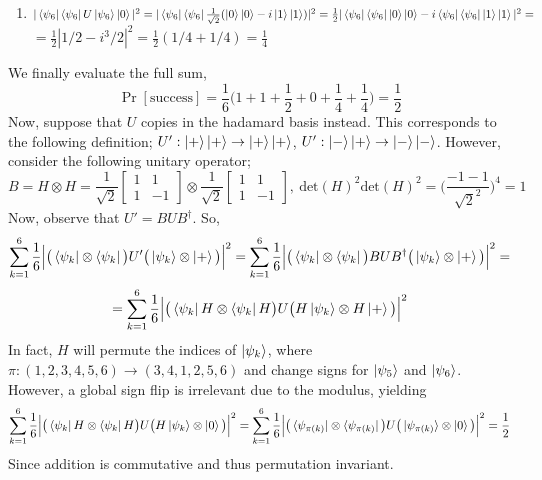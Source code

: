 \documentclass[12pt]{article}
\begin{document}
\begin{enumerate}
\begin{enumerate}
    \item $|\bra{\psi_6}\bra{\psi_6}U\ket{\psi_6} \ket{0}|^2 = |\bra{\psi_6}\bra{\psi_6}\frac{1}{\sqrt{2}}(\ket{0}\ket{0} - i\ket{1}\ket{1})|^2 = \frac{1}{2}|\bra{\psi_6}\bra{\psi_6}\ket{0}\ket{0} - i\bra{\psi_6}\bra{\psi_6}\ket{1}\ket{1}|^2 = $\\
    $= \frac{1}{2}|1/2 - i^3/2|^2 = \frac{1}{2}(1/4+1/4) = \frac{1}{4}$
\end{enumerate}
We finally evaluate the full sum,
$$ \Pr[\text{success}] = \frac{1}{6}\Big(1 + 1 + \frac{1}{2} + 0 + \frac{1}{4} + \frac{1}{4}\Big) = \frac{1}{2} $$
Now, suppose that $U$ copies in the hadamard basis instead. This corresponds to the following definition; $U' : \ket{+}\ket{+} \rightarrow \ket{+}\ket{+}$, $U' : \ket{-}\ket{+} \rightarrow \ket{-}\ket{-}$. However, consider the following unitary operator;
\[ B = H\otimes H = \frac{1}{\sqrt{2}}\begin{bmatrix}
1 & 1 \\
1 & -1
\end{bmatrix}\otimes \frac{1}{\sqrt{2}}\begin{bmatrix}
1 & 1 \\
1 & -1
\end{bmatrix},\ \text{det}(H)^2\text{det}(H)^2 = \Big(\frac{-1 - 1}{\sqrt{2}^2}\Big)^4 = 1
\]
Now, observe that $U' = BUB^\dagger$. So,
$$ \sum_{k=1}^6 \frac{1}{6}\Big| \big( \bra{\psi_k}\otimes \bra{\psi_k} \big) U' \big( \ket{\psi_k}\otimes \ket{+} \big) \Big|^2 = \sum_{k=1}^6 \frac{1}{6}\Big| \big( \bra{\psi_k}\otimes \bra{\psi_k} \big) B U B^\dagger \big( \ket{\psi_k} \otimes \ket{+} \big) \Big|^2 = $$
$$= \sum_{k=1}^6 \frac{1}{6}\Big| \big( \bra{\psi_k}H\otimes \bra{\psi_k}H \big) U \big( H\ket{\psi_k} \otimes H\ket{+} \big) \Big|^2$$
In fact, $H$ will permute the indices of $\ket{\psi_k}$, where $\pi : (1,2,3,4,5,6) \rightarrow  (3,4,1,2,5,6)$ and change signs for $\ket{\psi_5}$ and $\ket{\psi_6}$. However, a global sign flip is irrelevant due to the modulus, yielding
$$\sum_{k=1}^6 \frac{1}{6}\Big| \big( \bra{\psi_k}H\otimes \bra{\psi_k}H \big) U \big( H\ket{\psi_k} \otimes \ket{0} \big) \Big|^2 = \sum_{k=1}^6 \frac{1}{6}\Big| \big( \bra{\psi_{\pi(k)}}\otimes \bra{\psi_{\pi(k)}} \big) U \big( \ket{\psi_{\pi(k)}} \otimes \ket{0} \big) \Big|^2 = \frac{1}{2}$$
Since addition is commutative and thus permutation invariant.

\subsection{}


\end{enumerate}
\end{document}
